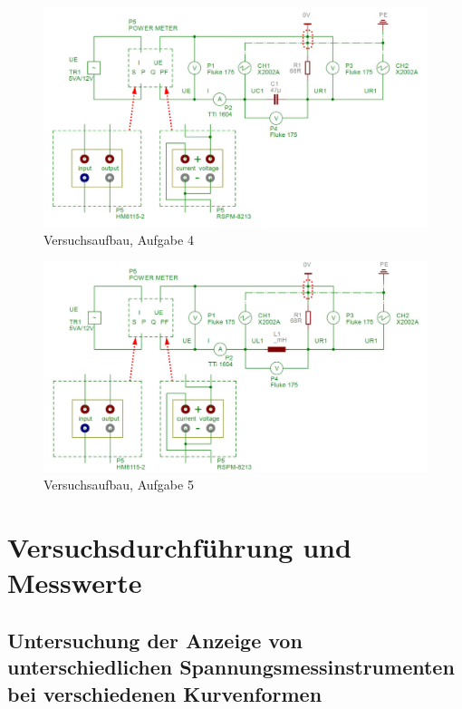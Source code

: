 \documentclass{article}
\begin{document}
\begin{figure}[H]
\centering
\caption{Versuchsaufbau, Aufgabe 4}
\label{fig:aufbau_task4}
\includegraphics[scale=1]{bilder/aufbau_task4.png}
\end{figure}



\begin{figure}[H]
\centering
\caption{Versuchsaufbau, Aufgabe 5}
\label{fig:aufbau_task5}
\includegraphics[scale=1]{bilder/aufbau_task5.png}
\end{figure}




\section{Versuchsdurchführung und Messwerte}

\subsection{Untersuchung  der  Anzeige  von  unterschiedlichen  Spannungsmessinstrumenten  bei verschiedenen Kurvenformen}
\end{document}
